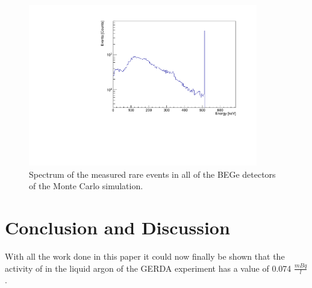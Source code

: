 \begin{figure}[t!]
	\centering
	\ifmakefigures%
	\includegraphics[width=100mm]{./Bilder/MC-514-Phasenraum.pdf}
	\fi%
	\caption{
    Spectrum of the measured rare \Kr events in all of the BEGe detectors of the Monte Carlo simulation.
	}
	\label{fig:PhasenraumMC514}
\end{figure}





\section{Conclusion and Discussion}
\label{sec:calcOfTheCon}

With all the work done in this paper it could now finally be shown that the activity of  in the liquid argon of the GERDA experiment has a value of 0.074 $\frac{\unit{mBq}}{\unit{l}}$. 




































